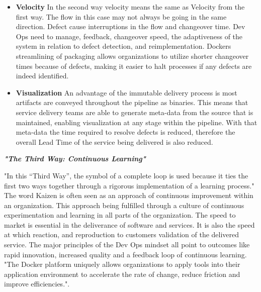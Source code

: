 \begin{itemize}
\item \textbf{Velocity}
	In the second way velocity means the same as Velocity from the first way. The flow in this case may not always be going in the same direction. Defect cause interruptions in the flow and changeover time. Dev Ops need to manage, feedback, changeover speed, the adaptiveness of the system in relation to defect detection, and reimplementation. Dockers streamlining of packaging allows organizations to utilize shorter changeover times because of defects, making it easier to halt processes if any defects are indeed identified.\cite{willis}
    \item \textbf{Visualization}
    An advantage of the immutable delivery process is most artifacts are conveyed throughout the pipeline as binaries\cite{willis}. This means that service delivery teams are able to generate meta-data from the source that is maintained, enabling visualization at any stage within the pipeline. With that meta-data the time required to resolve defects is reduced, therefore the overall Lead Time of the service being delivered is also reduced. 
\end{itemize}

\textbf{\emph{"The Third Way: Continuous Learning"}}

"In this “Third Way”, the symbol of a complete loop is used because it ties the first two ways together through a rigorous implementation of a learning process."\cite{willis} The word Kaizen is often seen as an approach of continuous improvement within an organization. This approach being fulfilled through a culture of continuous experimentation and learning in all parts of the organization\cite{willis}. The speed to market is essential in the deliverance of software and services. It is also the speed at which reaction, and reproduction to customers validation of the delivered service. The major principles of the Dev Ops mindset all point to outcomes like rapid innovation, increased quality and a feedback loop of continuous learning. "The Docker platform uniquely allows organizations to apply tools into their application environment to accelerate the rate of change, reduce friction and improve efficiencies."\cite{willis}.

